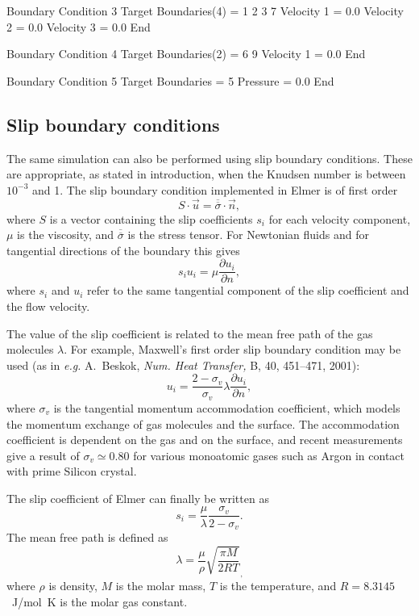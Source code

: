 Boundary Condition 3
  Target Boundaries(4) = 1 2 3 7
   Velocity 1 = 0.0
   Velocity 2 = 0.0
   Velocity 3 = 0.0
End

Boundary Condition 4
  Target Boundaries(2) = 6 9
   Velocity 1 = 0.0
End

Boundary Condition 5
  Target Boundaries = 5
  Pressure = 0.0
End
\ttend

\subsection*{Slip boundary conditions}

The same simulation can also be performed using slip boundary
conditions. These are appropriate, as stated in introduction, when the
Knudsen number is between $10^{-3}$ and 1. The slip boundary condition
implemented in Elmer is of first order 
\begin{equation}
S\cdot \vec{u} = \overline{\overline{\sigma}}\cdot\vec{n},
\end{equation}
where $S$ is a vector containing the slip coefficients $s_i$ for each
velocity component, $\mu$ is the viscosity, and
$\overline{\overline{\sigma}}$ is the stress tensor. For Newtonian
fluids and for tangential directions of the boundary this gives
\begin{equation}
s_i u_i = \mu\frac{\partial u_i}{\partial n},
\end{equation}
where $s_i$ and $u_i$ refer to the same tangential component of the
slip coefficient and the flow velocity.

The value of the slip coefficient is related to the mean free path of
the gas molecules $\lambda$. For example, Maxwell's first order slip
boundary condition may be used (as in {\em e.g.} A.~Beskok, {\em
Num. Heat Transfer,} B, 40, 451--471, 2001):
\begin{equation}
u_i = \frac{2-\sigma_v}{\sigma_v}\lambda 
\frac{\partial u_i}{\partial n},
\end{equation}
where $\sigma_v$ is the tangential momentum accommodation coefficient,
which models the momentum exchange of gas molecules and the
surface. The accommodation coefficient is dependent on the gas and on
the surface, and recent measurements give a result of $\sigma_v\simeq
0.80$ for various monoatomic gases such as Argon in contact with
prime Silicon crystal. 

The slip coefficient of Elmer can finally be written as
\begin{equation}
s_i = \frac{\mu}{\lambda}\frac{\sigma_v}{2-\sigma_v}.
\end{equation}
The mean free path is defined as
\begin{equation}
\lambda = \frac{\mu}{\rho}\sqrt{\frac{\pi M}{2RT}}_,
\end{equation}
where $\rho$ is density, $M$ is the molar mass, $T$ is the
temperature, and $R=8.3145$~J/mol~K is the molar gas constant.

